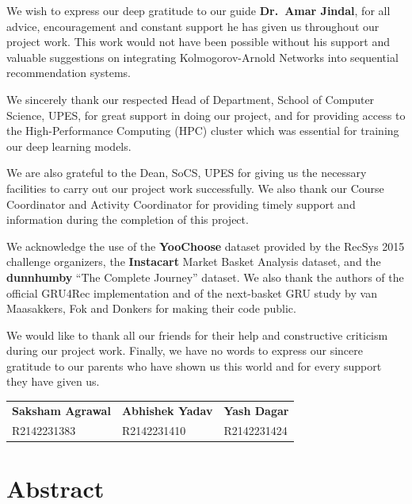 \documentclass[12pt,a4paper]{report}
\begin{document}
We wish to express our deep gratitude to our guide \textbf{Dr.\ Amar Jindal},
for all advice, encouragement and constant support he has given us throughout our
project work. This work would not have been possible without his support and
valuable suggestions on integrating Kolmogorov-Arnold Networks into sequential
recommendation systems.

We sincerely thank our respected Head of Department, School of Computer
Science, UPES, for great support in doing our project, and for providing access
to the High-Performance Computing (HPC) cluster which was essential for training
our deep learning models.

We are also grateful to the Dean, SoCS, UPES for giving us the necessary facilities
to carry out our project work successfully. We also thank our Course
Coordinator and Activity Coordinator for providing timely support and information
during the completion of this project.

We acknowledge the use of the \textbf{YooChoose} dataset provided by the RecSys 2015
challenge organizers, the \textbf{Instacart} Market Basket Analysis dataset, and
the \textbf{dunnhumby} ``The Complete Journey'' dataset. We also thank the authors
of the official GRU4Rec implementation and of the next-basket GRU study by van
Maasakkers, Fok and Donkers for making their code public.

We would like to thank all our friends for their help and constructive criticism
during our project work. Finally, we have no words to express our sincere gratitude
to our parents who have shown us this world and for every support they have given us.

\vspace{1.5cm}

\noindent
\begin{tabular}{p{4cm} p{4cm} p{4cm}}
\textbf{Saksham Agrawal} & \textbf{Abhishek Yadav} & \textbf{Yash Dagar} \\
R2142231383 & R2142231410 & R2142231424 \\
\end{tabular}

% 
% 
\chapter*{Abstract}




% 
\tableofcontents
\listoffigures
\listoftables
\end{document}

